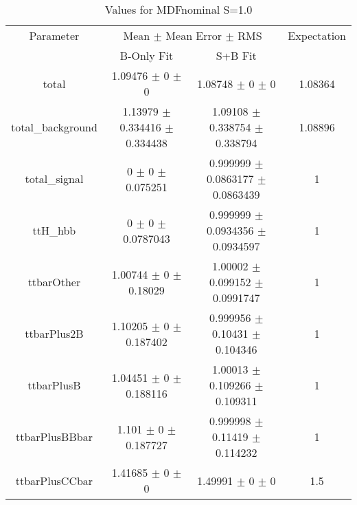 \begin{table}
\centering
\caption{Values for MDFnominal S=1.0}
\begin{tabular}{cccc}
\toprule
Parameter & \multicolumn{2}{c}{Mean $\pm$ Mean Error $\pm$ RMS} & Expectation\\
 & B-Only Fit & S+B Fit & \\
\midrule
total & \num{1.09476} $\pm$ \num{0} $\pm$ \num{0} & \num{1.08748} $\pm$ \num{0} $\pm$ \num{0} & \num{1.08364}\\
total\_background & \num{1.13979} $\pm$ \num{0.334416} $\pm$ \num{0.334438} & \num{1.09108} $\pm$ \num{0.338754} $\pm$ \num{0.338794} & \num{1.08896}\\
total\_signal & \num{0} $\pm$ \num{0} $\pm$ \num{0.075251} & \num{0.999999} $\pm$ \num{0.0863177} $\pm$ \num{0.0863439} & \num{1}\\
ttH\_hbb & \num{0} $\pm$ \num{0} $\pm$ \num{0.0787043} & \num{0.999999} $\pm$ \num{0.0934356} $\pm$ \num{0.0934597} & \num{1}\\
ttbarOther & \num{1.00744} $\pm$ \num{0} $\pm$ \num{0.18029} & \num{1.00002} $\pm$ \num{0.099152} $\pm$ \num{0.0991747} & \num{1}\\
ttbarPlus2B & \num{1.10205} $\pm$ \num{0} $\pm$ \num{0.187402} & \num{0.999956} $\pm$ \num{0.10431} $\pm$ \num{0.104346} & \num{1}\\
ttbarPlusB & \num{1.04451} $\pm$ \num{0} $\pm$ \num{0.188116} & \num{1.00013} $\pm$ \num{0.109266} $\pm$ \num{0.109311} & \num{1}\\
ttbarPlusBBbar & \num{1.101} $\pm$ \num{0} $\pm$ \num{0.187727} & \num{0.999998} $\pm$ \num{0.11419} $\pm$ \num{0.114232} & \num{1}\\
ttbarPlusCCbar & \num{1.41685} $\pm$ \num{0} $\pm$ \num{0} & \num{1.49991} $\pm$ \num{0} $\pm$ \num{0} & \num{1.5}\\
\bottomrule
\end{tabular}
\end{table}